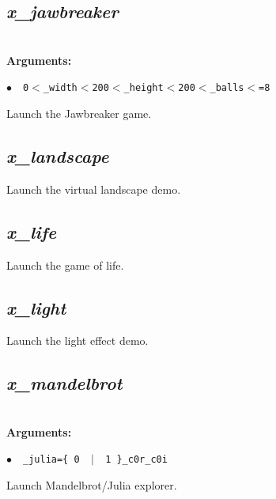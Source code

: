 \documentclass[a4paper,10.5pt,twoside]{book}
\def\comma{\discretionary{,}{}{,}}
\newcommand{\Cb}[1]{\textcolor{cb}{#1}}
\begin{document}
\subsection{\emph{x\_jawbreaker} }\vspace*{-0.7em}
~\\\textbf{\Cb{Arguments: }}\begin{flushleft}
{\small \Cb{\hspace*{0.5cm}$\bullet$~~\texttt{0$<$\_width$<$20{\comma}0$<$\_height$<$20{\comma}0$<$\_balls$<$=8}}}\end{flushleft}
Launch the Jawbreaker game.


\subsection{\emph{x\_landscape} }\vspace*{-0.7em}
Launch the virtual landscape demo.


\subsection{\emph{x\_life} }\vspace*{-0.7em}
Launch the game of life.


\subsection{\emph{x\_light} }\vspace*{-0.7em}
Launch the light effect demo.


\subsection{\emph{x\_mandelbrot} }\vspace*{-0.7em}
~\\\textbf{\Cb{Arguments: }}\begin{flushleft}
{\small \Cb{\hspace*{0.5cm}$\bullet$~~\texttt{\_julia=\{ 0 ~$|$~ 1 \}{\comma}\_c0r{\comma}\_c0i}}}\end{flushleft}
Launch Mandelbrot/Julia explorer.
\end{document}
